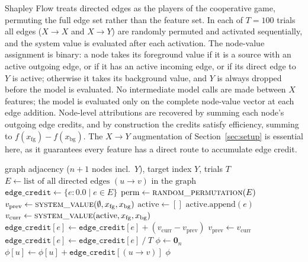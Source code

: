 \documentclass[12pt,a4paper,oneside]{article}
\begin{document}
Shapley Flow treats directed edges as the players of the cooperative game, permuting the full edge set rather than the feature set. In each of $T = 100$ trials all edges ($X \to X$ and $X \to Y$) are randomly permuted and activated sequentially, and the system value is evaluated after each activation. The node-value assignment is binary: a node takes its foreground value if it is a source with an active outgoing edge, or if it has an active incoming edge, or if its direct edge to $Y$ is active; otherwise it takes its background value, and $Y$ is always dropped before the model is evaluated. No intermediate model calls are made between $X$ features; the model is evaluated only on the complete node-value vector at each edge addition. Node-level attributions are recovered by summing each node's outgoing edge credits, and by construction the credits satisfy efficiency, summing to $f(x_{\mathrm{fg}}) - f(x_{\mathrm{bg}})$. The $X \to Y$ augmentation of Section~\ref{sec:setup} is essential here, as it guarantees every feature has a direct route to accumulate edge credit.

\begin{algorithm}[H]
  \caption{Shapley Flow (uniform edge-permutation)}
  \label{alg:flow}
  \begin{algorithmic}[1]
    \Statex \hspace{2.5em} graph adjacency ($n+1$ nodes incl.\ $Y$), target index $Y$, trials $T$
    \State $E \gets \text{list of all directed edges } (u \to v) \text{ in the graph}$
    \State $\texttt{edge\_credit} \gets \{e: 0.0 \mid e \in E\}$
      \State $\text{perm} \gets \textsc{random\_permutation}(E)$  
      \State $v_{\text{prev}} \gets \textsc{system\_value}(\emptyset, x_{\mathrm{fg}}, x_{\mathrm{bg}})$  
      \State $\text{active} \gets []$
        \State $\text{active}.\text{append}(e)$
        \State $v_{\text{curr}} \gets \textsc{system\_value}(\text{active}, x_{\mathrm{fg}}, x_{\mathrm{bg}})$
        \State $\texttt{edge\_credit}[e] \gets \texttt{edge\_credit}[e] + (v_{\text{curr}} - v_{\text{prev}})$
        \State $v_{\text{prev}} \gets v_{\text{curr}}$
      \EndFor
    \EndFor
    \quad $\texttt{edge\_credit}[e] \gets \texttt{edge\_credit}[e] \mathbin{/} T$\EndFor
    \State $\phi \gets \mathbf{0}_n$  
      \quad $\phi[u] \gets \phi[u] + \texttt{edge\_credit}[(u \to v)]$\EndIf
    \EndFor
    \Return $\phi$
  \end{algorithmic}
\end{algorithm}
\end{document}
